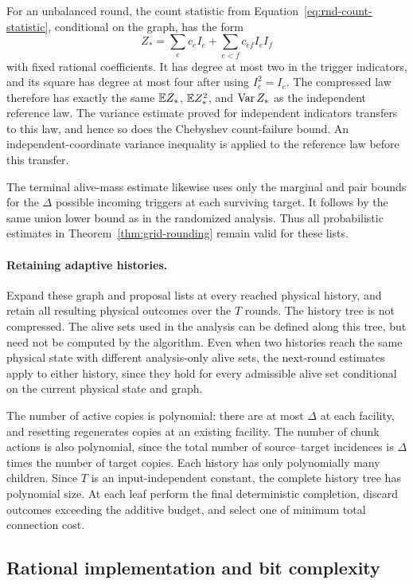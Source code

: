 For an unbalanced round, the count statistic from
Equation~\eqref{eq:rnd-count-statistic}, conditional on the graph,
has the form
\[
 Z_*=
 \sum_e c_e I_e+\sum_{e<f}c_{ef}I_eI_f
\]
with fixed rational coefficients. It has degree at most two in the
trigger indicators, and its square has degree at most four after using
\(I_e^2=I_e\). The compressed law therefore has exactly the same
\(\mathbb E Z_*\), \(\mathbb E Z_*^2\), and \(\operatorname{Var} Z_*\) as the independent
reference law. The variance estimate proved for independent
indicators transfers to this law, and hence so does the Chebyshev
count-failure bound. An independent-coordinate variance inequality
is applied to the reference law before this transfer.

The terminal alive-mass estimate likewise uses only the marginal and
pair bounds for the \(\Delta\) possible incoming triggers at each
surviving target. It follows by the same union lower bound as in the
randomized analysis. Thus all probabilistic estimates in
Theorem~\ref{thm:grid-rounding} remain valid for these lists.

\paragraph{Retaining adaptive histories.}
Expand these graph and proposal lists at every reached physical
history, and retain all resulting physical outcomes over the
\(T\) rounds. The history tree is not compressed. The alive sets
used in the analysis can be defined along this tree, but need not be
computed by the algorithm. Even when two histories reach the same
physical state with different analysis-only alive sets, the
next-round estimates apply to either history, since they hold for
every admissible alive set conditional on the current physical state
and graph.

The number of active copies is polynomial: there are at most
\(\Delta\) at each facility, and resetting regenerates copies at an
existing facility. The number of chunk actions is also polynomial,
since the total number of source--target incidences is
\(\Delta\) times the number of target copies. Each history has only
polynomially many children. Since \(T\) is an input-independent
constant, the complete history tree has polynomial size. At each
leaf perform the final deterministic completion, discard outcomes
exceeding the additive budget, and select one of minimum total
connection cost.

\subsection{Rational implementation and bit complexity}

